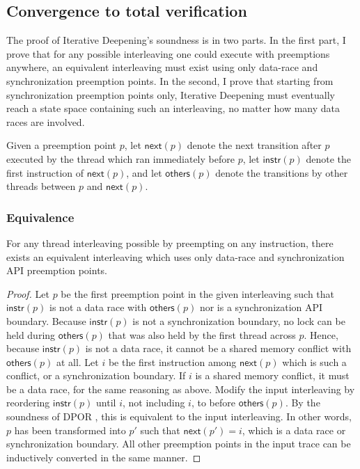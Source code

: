 \subsection{Convergence to total verification}
\label{sec:quicksand-convergence}

The proof of Iterative Deepening's soundness is in two parts.
In the first part, I prove that for any possible interleaving
one could execute with preemptions anywhere,
an equivalent interleaving must exist using only data-race and synchronization preemption points.
In the second, I prove that starting from synchronization preemption points only,
Iterative Deepening must eventually reach a state space containing such an interleaving,
no matter how many data races are involved.

\newcommand\ppnext[1]{\ensuremath{\mathsf{next}(#1)}}
\newcommand\ppinstr[1]{\ensuremath{\mathsf{instr}(#1)}}
\newcommand\ppothers[1]{\ensuremath{\mathsf{others}(#1)}}

Given a preemption point $p$,
let $\ppnext{p}$ denote the next transition after $p$ executed by the thread which ran immediately before $p$,
let $\ppinstr{p}$ denote the first instruction of $\ppnext{p}$,
and let $\ppothers{p}$ denote the transitions by other threads between $p$ and $\ppnext{p}$.

\subsubsection{Equivalence}

\begin{lemma}
	For any thread interleaving possible by preempting on any instruction,
	there exists an equivalent interleaving which uses only data-race and synchronization API preemption points.
        \label{lem:relevant}
\end{lemma}

\begin{proof}
Let $p$ be the first preemption point in the given interleaving
such that $\ppinstr{p}$ is not a data race with $\ppothers{p}$ nor is a synchronization API boundary.
Because $\ppinstr{p}$ is not a synchronization boundary,
no lock can be held during $\ppothers{p}$ that was also held by the first thread across $p$.
Hence, because $\ppinstr{p}$ is not a data race, it cannot be a shared memory conflict with $\ppothers{p}$ at all.
Let $i$ be the first instruction among $\ppnext{p}$ which is such a conflict, or a synchronization boundary.
If $i$ is a shared memory conflict, it must be a data race, for the same reasoning as above.
Modify the input interleaving by reordering $\ppinstr{p}$ until $i$, not including $i$, to before $\ppothers{p}$.
By the soundness of DPOR \cite{dpor}, this is equivalent to the input interleaving.
In other words, $p$ has been transformed into $p'$ such that $\ppnext{p'} = i$,
which is a data race or synchronization boundary.
All other preemption points in the input trace can be inductively converted in the same manner.
\end{proof}

